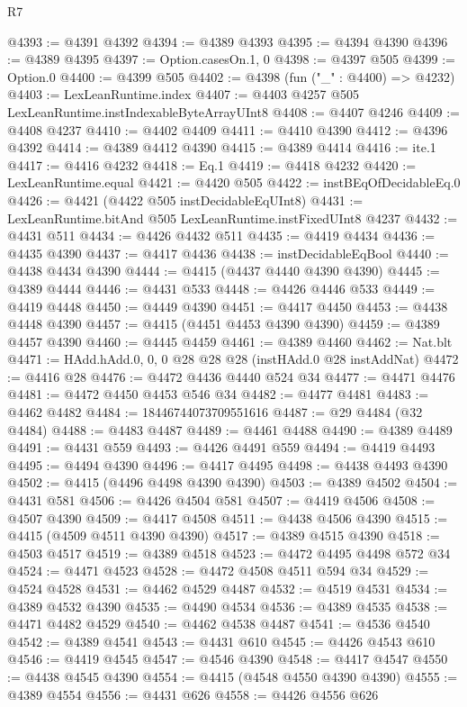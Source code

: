 \begin{lexlean}{R7}
\begin{coremodule}
@4393 := @4391 @4392
@4394 := @4389 @4393
@4395 := @4394 @4390
@4396 := @4389 @4395
@4397 := Option.casesOn.{1, 0}
@4398 := @4397 @505
@4399 := Option.{0}
@4400 := @4399 @505
@4402 := @4398 (fun ("_" : @4400) => @4232)
@4403 := LexLeanRuntime.index
@4407 := @4403 @4257 @505 LexLeanRuntime.instIndexableByteArrayUInt8
@4408 := @4407 @4246
@4409 := @4408 @4237
@4410 := @4402 @4409
@4411 := @4410 @4390
@4412 := @4396 @4392
@4414 := @4389 @4412 @4390
@4415 := @4389 @4414
@4416 := ite.{1}
@4417 := @4416 @4232
@4418 := Eq.{1}
@4419 := @4418 @4232
@4420 := LexLeanRuntime.equal
@4421 := @4420 @505
@4422 := instBEqOfDecidableEq.{0}
@4426 := @4421 (@4422 @505 instDecidableEqUInt8)
@4431 := LexLeanRuntime.bitAnd @505 LexLeanRuntime.instFixedUInt8 @4237
@4432 := @4431 @511
@4434 := @4426 @4432 @511
@4435 := @4419 @4434
@4436 := @4435 @4390
@4437 := @4417 @4436
@4438 := instDecidableEqBool
@4440 := @4438 @4434 @4390
@4444 := @4415 (@4437 @4440 @4390 @4390)
@4445 := @4389 @4444
@4446 := @4431 @533
@4448 := @4426 @4446 @533
@4449 := @4419 @4448
@4450 := @4449 @4390
@4451 := @4417 @4450
@4453 := @4438 @4448 @4390
@4457 := @4415 (@4451 @4453 @4390 @4390)
@4459 := @4389 @4457 @4390
@4460 := @4445 @4459
@4461 := @4389 @4460
@4462 := Nat.blt
@4471 := HAdd.hAdd.{0, 0, 0} @28 @28 @28 (instHAdd.{0} @28 instAddNat)
@4472 := @4416 @28
@4476 := @4472 @4436 @4440 @524 @34
@4477 := @4471 @4476
@4481 := @4472 @4450 @4453 @546 @34
@4482 := @4477 @4481
@4483 := @4462 @4482
@4484 := 18446744073709551616
@4487 := @29 @4484 (@32 @4484)
@4488 := @4483 @4487
@4489 := @4461 @4488
@4490 := @4389 @4489
@4491 := @4431 @559
@4493 := @4426 @4491 @559
@4494 := @4419 @4493
@4495 := @4494 @4390
@4496 := @4417 @4495
@4498 := @4438 @4493 @4390
@4502 := @4415 (@4496 @4498 @4390 @4390)
@4503 := @4389 @4502
@4504 := @4431 @581
@4506 := @4426 @4504 @581
@4507 := @4419 @4506
@4508 := @4507 @4390
@4509 := @4417 @4508
@4511 := @4438 @4506 @4390
@4515 := @4415 (@4509 @4511 @4390 @4390)
@4517 := @4389 @4515 @4390
@4518 := @4503 @4517
@4519 := @4389 @4518
@4523 := @4472 @4495 @4498 @572 @34
@4524 := @4471 @4523
@4528 := @4472 @4508 @4511 @594 @34
@4529 := @4524 @4528
@4531 := @4462 @4529 @4487
@4532 := @4519 @4531
@4534 := @4389 @4532 @4390
@4535 := @4490 @4534
@4536 := @4389 @4535
@4538 := @4471 @4482 @4529
@4540 := @4462 @4538 @4487
@4541 := @4536 @4540
@4542 := @4389 @4541
@4543 := @4431 @610
@4545 := @4426 @4543 @610
@4546 := @4419 @4545
@4547 := @4546 @4390
@4548 := @4417 @4547
@4550 := @4438 @4545 @4390
@4554 := @4415 (@4548 @4550 @4390 @4390)
@4555 := @4389 @4554
@4556 := @4431 @626
@4558 := @4426 @4556 @626

\end{coremodule}
\end{lexlean}
